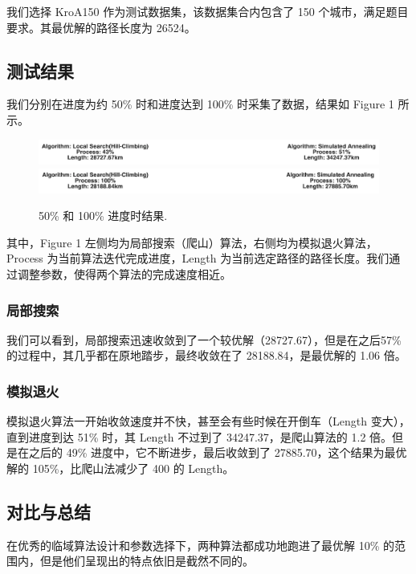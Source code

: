 我们选择 KroA150 作为测试数据集，该数据集合内包含了 150 个城市，满足题目要求。其最优解的路径长度为 26524\cite{besttsp}。

\subsection{测试结果}

我们分别在进度为约 50\% 时和进度达到 100\% 时采集了数据，结果如 Figure 1 所示。

\begin{figure}
\centering
\includegraphics[width=\textwidth]{mid.png}
\includegraphics[width=\textwidth]{final.png}
\caption{\label{fig:final}50\% 和 100\% 进度时结果.}
\end{figure}

其中，Figure 1 左侧均为局部搜索（爬山）算法，右侧均为模拟退火算法，Process 为当前算法迭代完成进度，Length 为当前选定路径的路径长度。我们通过调整参数，使得两个算法的完成速度相近。

\subsubsection{局部搜索}

我们可以看到，局部搜索迅速收敛到了一个较优解（28727.67），但是在之后57\%的过程中，其几乎都在原地踏步，最终收敛在了 28188.84，是最优解的 1.06 倍。

\subsubsection{模拟退火}

模拟退火算法一开始收敛速度并不快，甚至会有些时候在开倒车（Length 变大），直到进度到达 51\% 时，其 Length 不过到了 34247.37，是爬山算法的 1.2 倍。但是在之后的 49\% 进度中，它不断进步，最后收敛到了 27885.70，这个结果为最优解的 105\%，比爬山法减少了 400 的 Length。

\subsection{对比与总结}

在优秀的临域算法设计和参数选择下，两种算法都成功地跑进了最优解 10\% 的范围内，但是他们呈现出的特点依旧是截然不同的。

